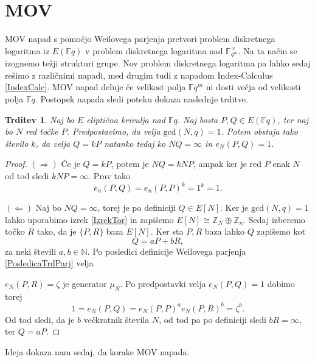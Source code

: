\documentclass[12pt,a4paper,twoside]{article}
\theoremstyle{definition} %
\theoremstyle{plain} %
\newtheorem{trditev}[definicija]{Trditev}
\numberwithin{equation}{section}  %
\newcommand{\N}{\mathbb N}
\newcommand{\Z}{\mathbb Z}
\newcommand{\F}{\mathbb F}
\begin{document}
\section{MOV}
MOV napad s pomočjo Weilovega parjenja pretvori problem diskretnega logaritma iz $E(\F{q})$ v problem diskretnega logaritma nad $\F^{\times}_{q^m}$. Na ta način se izognemo težji strukturi grupe. Nov problem diskretnega logaritma pa lahko sedaj rešimo z različnimi napadi, med drugim tudi z napadom Index-Calculus \ref{IndexCalc}. MOV napad deluje če velikost polja $\F{q^m}$ ni dosti večja od velikosti polja $\F{q}$. Postopek napada sledi poteku dokaza naslednje trditve.

\begin{trditev}
Naj bo $E$ eliptična krivulja nad $\F{q}$. Naj bosta $P,Q \in E(\F{q})$, ter naj bo $N$ red točke $P$. Predpostavimo, da velja $\text{gcd}(N,q)=1$. Potem obstaja tako število $k$, da velja $Q = kP$ natanko tedaj ko $NQ = \infty$ in $e_N(P,Q)=1$.
\end{trditev}

\begin{proof}
$(\Rightarrow)$ Če je $Q = kP$, potem je $NQ = kNP$, ampak ker je red $P$ enak $N$ od tod sledi $kNP = \infty$. Prav tako
$$e_n(P,Q) = e_n(P,P)^k = 1^k = 1.$$

$(\Leftarrow)$ Naj bo $NQ = \infty$, torej je po definiciji $Q \in E[N]$. Ker je $\text{gcd}(N,q) = 1$ lahko uporabimo izrek \ref{IzrekTor} in zapišemo 
$E[N] \cong \Z_N \oplus \Z_n$. Sedaj izberemo točko $R$ tako, da je $\{P,R \}$ baza $E[N]$. Ker sta $P,R$ baza  lahko $Q$ zapišemo kot
$$Q = aP+bR,$$
za neki števili $a,b \in \N$. Po posledici definicije Weilovega parjenja \ref{PosledicaTrdParj} velja 

\noindent $e_N(P,R)=\zeta$ je generator $\mu_N$.
Po predpostavki velja $e_N(P,Q) = 1$ dobimo torej
$$1 = e_N(P,Q) = e_N(P,P)^ae_N(P,R)^b = \zeta^b.$$
Od tod sledi, da je $b$ večkratnik števila $N$, od tod pa po definiciji sledi $bR = \infty$, ter $Q = aP$.
\end{proof}

Ideja dokaza nam sedaj, da korake MOV napada.
\end{document}

